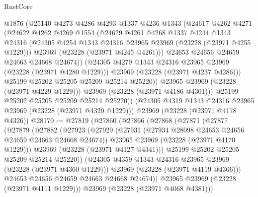 \begin{lexlean}{RustCore}
\begin{coremodule}
                @1876
                (@25140
                  @4273
                  @4286
                  @4293
                  @1337
                  @4236
                  @1343
                  (@24617
                    @4262
                    @4271
                    (@24622
                      @4262
                      @4269
                      @1554
                      (@24629
                        @4261
                        @4268
                        @1337
                        @4244
                        @1343
                        @24316
                        (@24305 @4254 @1343 @24316 @23965 @23969 (@23228 (@23971 @4255 @1229)))
                        @23969
                        (@23228 (@23971 @4245 @4261)))
                      @24653
                      @24656
                      @24659
                      @24663
                      @24668
                      @24674))
                  (@24305 @4279 @1343 @24316 @23965 @23969 (@23228 (@23971 @4280 @1229)))
                  @23969
                  (@23228 (@23971 @4237 @4286)))
                @25199
                @25202
                @25205
                @25209
                @25214
                @25220))
            @23965
            @23969
            (@23228 (@23971 @4229 @1229)))
          @23969
          (@23228 (@23971 @4186 @4301)))
        @25199
        @25202
        @25205
        @25209
        @25214
        @25220))
    (@24305 @4319 @1343 @24316 @23965 @23969 (@23228 (@23971 @4320 @1229)))
    @23969
    (@23228 (@23971 @4178 @4326))
@28170 := @27819
    (@27860
      (@27866
        (@27868
          (@27871
            (@27877
              (@27879
                (@27882
                  (@27923
                    (@27929
                      (@27931 (@27934 @28098 @24653 @24656 @24659 @24663 @24668 @24674))
                      @23965
                      @23969
                      (@23228 (@23971 @4170 @1229)))
                    @23969
                    (@23228 (@23971 @4127 @4341)))
                  @25199
                  @25202
                  @25205
                  @25209
                  @25214
                  @25220))
              (@24305 @4359 @1343 @24316 @23965 @23969 (@23228 (@23971 @4360 @1229)))
              @23969
              (@23228 (@23971 @4119 @4366)))
            @24653
            @24656
            @24659
            @24663
            @24668
            @24674))
        @23965
        @23969
        (@23228 (@23971 @4111 @1229)))
      @23969
      (@23228 (@23971 @4068 @4381)))

\end{coremodule}
\end{lexlean}
